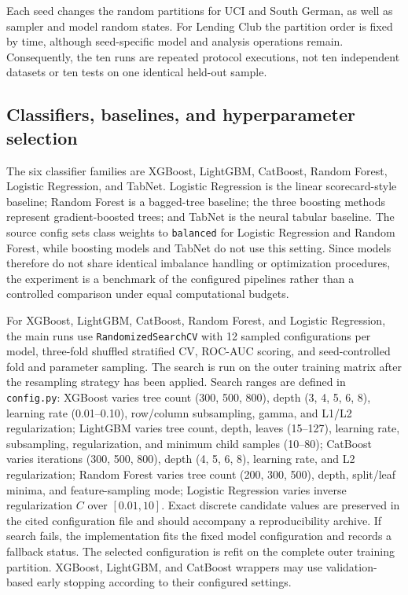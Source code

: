 \documentclass[pdflatex,sn-mathphys-num]{sn-jnl}
\begin{document}
Each seed changes the random partitions for UCI and South German, as well as sampler and model random states. For Lending Club the partition order is fixed by time, although seed-specific model and analysis operations remain. Consequently, the ten runs are repeated protocol executions, not ten independent datasets or ten tests on one identical held-out sample.

\subsection{Classifiers, baselines, and hyperparameter selection}
The six classifier families are XGBoost, LightGBM, CatBoost, Random Forest, Logistic Regression, and TabNet. Logistic Regression is the linear scorecard-style baseline; Random Forest is a bagged-tree baseline; the three boosting methods represent gradient-boosted trees; and TabNet is the neural tabular baseline. The source config sets class weights to \texttt{balanced} for Logistic Regression and Random Forest, while boosting models and TabNet do not use this setting. Since models therefore do not share identical imbalance handling or optimization procedures, the experiment is a benchmark of the configured pipelines rather than a controlled comparison under equal computational budgets.

For XGBoost, LightGBM, CatBoost, Random Forest, and Logistic Regression, the main runs use \texttt{RandomizedSearchCV} with 12 sampled configurations per model, three-fold shuffled stratified CV, ROC-AUC scoring, and seed-controlled fold and parameter sampling. The search is run on the outer training matrix after the resampling strategy has been applied. Search ranges are defined in \texttt{config.py}: XGBoost varies tree count (300, 500, 800), depth (3, 4, 5, 6, 8), learning rate (0.01--0.10), row/column subsampling, gamma, and L1/L2 regularization; LightGBM varies tree count, depth, leaves (15--127), learning rate, subsampling, regularization, and minimum child samples (10--80); CatBoost varies iterations (300, 500, 800), depth (4, 5, 6, 8), learning rate, and L2 regularization; Random Forest varies tree count (200, 300, 500), depth, split/leaf minima, and feature-sampling mode; Logistic Regression varies inverse regularization $C$ over $[0.01,10]$. Exact discrete candidate values are preserved in the cited configuration file and should accompany a reproducibility archive. If search fails, the implementation fits the fixed model configuration and records a fallback status. The selected configuration is refit on the complete outer training partition. XGBoost, LightGBM, and CatBoost wrappers may use validation-based early stopping according to their configured settings.
\end{document}
